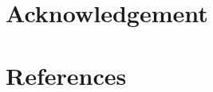 \documentclass[preprint,5p,times]{elsarticle}
\begin{document}
\section*{Acknowledgement}

\appendix
\section{}
\label{app:}

\section*{References}

\end{document}
